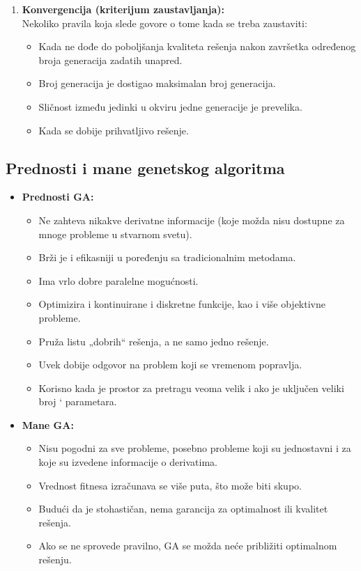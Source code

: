 \documentclass[a4paper]{article}
\begin{document}
\begin{enumerate}
    \item \textbf{Konvergencija (kriterijum zaustavljanja):}\\
    Nekoliko pravila koja slede govore o tome kada se treba zaustaviti:
    \begin{itemize}
	    \item Kada ne dođe do poboljšanja kvaliteta rešenja nakon završetka određenog broja generacija zadatih unapred. 
        \item  Broj generacija je dostigao maksimalan broj generacija.
        \item Sličnost između jedinki u okviru jedne generacije je prevelika.
        \item Kada se dobije prihvatljivo rešenje.

    \end{itemize}
\end{enumerate}

\subsection{Prednosti i mane genetskog algoritma}
\renewcommand\labelitemii{$\square$}
\begin{itemize}
   \item \textbf{Prednosti GA:}
        \begin{itemize}
             \item Ne zahteva nikakve derivatne informacije (koje možda nisu dostupne za mnoge probleme u stvarnom svetu).
             \item Brži je i efikasniji u poređenju sa tradicionalnim metodama. 
             \item Ima vrlo dobre paralelne mogućnosti.
             \item Optimizira i kontinuirane i diskretne funkcije, kao i više objektivne probleme. 
             \item Pruža listu „dobrih“ rešenja, a ne samo jedno rešenje. 
             \item Uvek dobije odgovor na problem koji se vremenom popravlja. 
             \item Korisno kada je prostor za pretragu veoma velik i ako je uključen veliki broj  ‘ parametara. 
        \end{itemize}
   \item \textbf{Mane GA:}
        \begin{itemize}
             \item Nisu pogodni za sve probleme, posebno probleme koji su jednostavni i za koje su izvedene informacije o derivatima. 
             \item Vrednost fitnesa izračunava se više puta, što može biti skupo. 
             \item Budući da je stohastičan, nema garancija za optimalnost ili kvalitet rešenja.
             \item Ako se ne sprovede pravilno, GA se možda neće približiti optimalnom rešenju.
        \end{itemize}
   
\end{itemize}




\appendix
 

\end{document}
